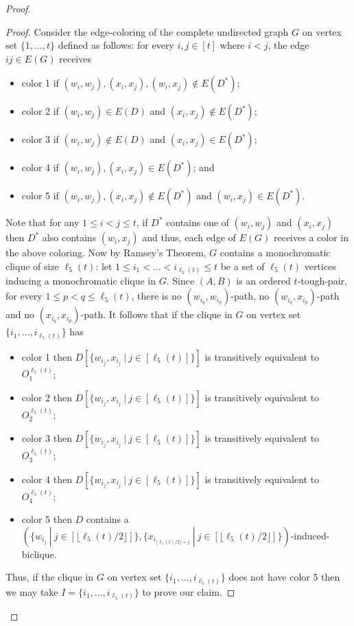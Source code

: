 \documentclass[a4paper,11pt]{article}
\theoremstyle{plain}
\newtheorem{identification rule}{Identification Rule}
\theoremstyle{definition}
\theoremstyle{remark}
\newenvironment{claimproof}{\begin{proof}\renewcommand{\qedsymbol}{\claimqed}}{\end{proof}\renewcommand{\qedsymbol}{\plainqed}}
\let\plainqed\qedsymbol
\newcommand{\claimqed}{$\lrcorner$}
\newcommand{\toughpair}{tough-pair}
\begin{document}
\begin{proof}
\begin{claimproof}
Consider the edge-coloring of the complete undirected graph $G$ on vertex set $\{1,\ldots,t\}$ defined as follows: for every $i,j \in [t]$ where $i < j$, the edge $ij \in E(G)$ receives 
\begin{itemize}
\item color 1 if $(w_i,w_j),(x_i,x_j),(w_i,x_j) \notin E(D^*)$;
\item color 2 if $(w_i,w_j) \in E(D)$ and $(x_i,x_j) \notin E(D^*)$;
\item color 3 if $(w_i,w_j) \notin E(D)$ and $(x_i,x_j) \in E(D^*)$;
\item color 4 if $(w_i,w_j),(x_i,x_j) \in E(D^*)$; and
\item color 5 if $(w_i,w_j),(x_i,x_j) \notin E(D^*)$ and $(w_i,x_j) \in E(D^*)$.
\end{itemize}
Note that for any $1 \leq i<j \leq t$, if $D^*$ contains one of $(w_i,w_j)$ and $(x_i,x_j)$ then $D^*$ also contains $(w_i,x_j)$ and thus, each edge of $E(G)$ receives a color in the above coloring.
Now by Ramsey's Theorem, $G$ contains a monochromatic clique of size $\ell_5(t)$: let $1 \leq i_1 < \ldots < i_{\ell_5(t)} \leq t$ be a set of $\ell_5(t)$ vertices inducing a monochromatic clique in $G$. Since $(A,B)$ is an ordered $t$-\toughpair, for every $1 \leq p < q \leq \ell_5(t)$, there is no $(w_{i_q},w_{i_p})$-path, no $(w_{i_q},x_{i_p})$-path and no $(x_{i_q},x_{i_p})$-path. It follows that if the clique in $G$ on vertex set $\{i_1,\ldots,i_{\ell_5(t)}\}$ has 
\begin{itemize}
\item color 1 then $D[\{w_{i_j},x_{i_j}~|~ j \in [\ell_5(t)]\}]$ is transitively equivalent to $O^{\ell_5(t)}_1$;
\item color 2 then $D[\{w_{i_j},x_{i_j}~|~ j \in [\ell_5(t)]\}]$ is transitively equivalent to $O^{\ell_5(t)}_2$;
\item color 3 then $D[\{w_{i_j},x_{i_j}~|~ j \in [\ell_5(t)]\}]$ is transitively equivalent to $O^{\ell_5(t)}_3$;
\item color 4 then $D[\{w_{i_j},x_{i_j}~|~ j \in [\ell_5(t)]\}]$ is transitively equivalent to $O^{\ell_5(t)}_4$;
\item color 5 then $D$ contains a $(\{w_{i_j}~|~j \in [\lfloor \ell_5(t)/2 \rfloor]\},\{x_{i_{\lfloor \ell_5(t)/2 \rfloor + j}}~|~j \in [\lfloor \ell_5(t)/2 \rfloor]\})$-induced-biclique.
\end{itemize}
Thus, if the clique in $G$ on vertex set $\{i_1,\ldots,i_{\ell_5(t)}\}$ does not have color 5 then we may take $I = \{i_1,\ldots,i_{\ell_5(t)}\}$ to prove our claim.  
\end{claimproof}


\end{proof}
\end{document}
